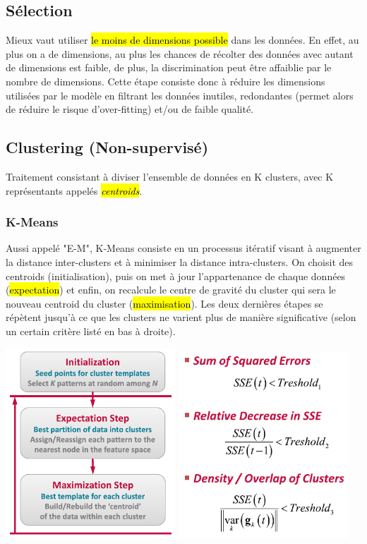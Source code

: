 \documentclass[letterpaper, 12pt]{article}
\newcommand{\alinea}{
\hspace*{0.5cm}}
\begin{document}
		\subsection{Sélection}
			\alinea Mieux vaut utiliser \hl{le moins de dimensions possible} dans les données. En effet, au plus on a de dimensions, 
				au plus les chances de récolter des données avec autant de dimensions est faible, de plus, la discrimination peut être
				affaiblie par le nombre de dimensions. Cette étape consiste donc à réduire les dimensions utilisées par le modèle
				en filtrant les données inutiles, redondantes (permet alors de réduire le risque d'over-fitting) et/ou de faible qualité.
		\subsection{Clustering (Non-supervisé)}
			\alinea Traitement consistant à diviser l'ensemble de données en K clusters, avec K représentants appelés
				\hl{\textit{centroids}}.
			\subsubsection{K-Means}
				\alinea Aussi appelé "E-M", K-Means consiste en un processus itératif visant à augmenter la distance inter-clusters
					et à minimiser la distance intra-clusters. On choisit des centroids (initialisation), puis on met à jour 
					l'appartenance de chaque données (\hl{expectation}) et enfin, on recalcule le centre de gravité du cluster qui sera
					le nouveau centroid du cluster (\hl{maximisation}). Les deux dernières étapes se répètent jusqu'à ce que les clusters
					ne varient plus de manière significative (selon un certain critère listé en bas à droite).
				\begin{center}
					\includegraphics[width=2.5in]{Images/kmeans} \includegraphics[width=2.5in]{Images/kmeans2} 
				\end{center}
\end{document}
